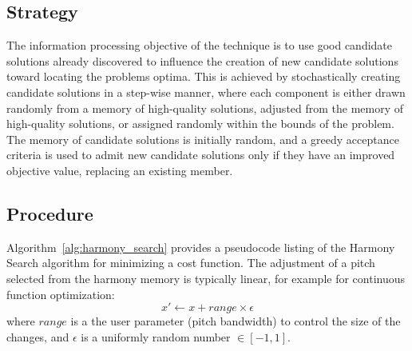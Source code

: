 \subsection{Strategy}
The information processing objective of the technique is to use good candidate solutions already discovered to influence the creation of new candidate solutions toward locating the problems optima.
This is achieved by stochastically creating candidate solutions in a step-wise manner, where each component is either drawn randomly from a memory of high-quality solutions, adjusted from the memory of high-quality solutions, or assigned randomly within the bounds of the problem. The memory of candidate solutions is initially random, and a greedy acceptance criteria is used to admit new candidate solutions only if they have an improved objective value, replacing an existing member.

\subsection{Procedure}
Algorithm~\ref{alg:harmony_search} provides a pseudocode listing of the Harmony Search algorithm for minimizing a cost function. 
The adjustment of a pitch selected from the harmony memory is typically linear, for example for continuous function optimization: 
\begin{equation}
	x' \leftarrow x + range \times \epsilon
\end{equation}
where $range$ is a the user parameter (pitch bandwidth) to control the size of the changes, and $\epsilon$ is a uniformly random number $\in [-1,1]$.

